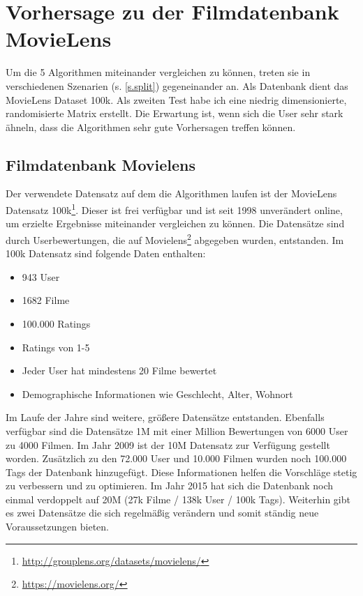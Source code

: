 \section{Vorhersage zu der Filmdatenbank MovieLens}\label{s.Test} \raggedbottom
Um die 5 Algorithmen miteinander vergleichen zu können, treten sie in verschiedenen Szenarien (s.  \autoref{s.split}) gegeneinander an. Als Datenbank dient das MovieLens Dataset 100k. Als zweiten Test habe ich eine niedrig dimensionierte, randomisierte Matrix erstellt. Die Erwartung ist, wenn sich die User sehr stark ähneln, dass die Algorithmen sehr gute Vorhersagen treffen können.

\subsection{Filmdatenbank Movielens}\label{s.Datenmenge}
Der verwendete Datensatz auf dem die Algorithmen laufen ist der MovieLens Datensatz 100k\footnote{\url{http://grouplens.org/datasets/movielens/}}. Dieser ist frei verfügbar und ist seit 1998 unverändert online, um erzielte Ergebnisse miteinander vergleichen zu können. Die Datensätze sind durch Userbewertungen, die auf Movielens\footnote{\url{https://movielens.org/}} abgegeben wurden, entstanden.
Im 100k Datensatz sind folgende Daten enthalten:
\begin{itemize}
	\item 943 User
	\item 1682 Filme
	\item 100.000 Ratings
	\item Ratings von 1-5
	\item Jeder User hat mindestens 20 Filme bewertet
	\item Demographische Informationen wie Geschlecht, Alter, Wohnort
\end{itemize}
Im Laufe der Jahre sind weitere, größere Datensätze entstanden. 
Ebenfalls verfügbar sind die Datensätze 1M mit einer Million Bewertungen von 6000 User zu 4000 Filmen. Im Jahr 2009 ist der 10M Datensatz zur Verfügung gestellt worden. Zusätzlich zu den 72.000 User und 10.000 Filmen wurden noch 100.000 Tags der Datenbank hinzugefügt. Diese Informationen helfen die Vorschläge stetig zu verbessern und zu optimieren. Im Jahr 2015 hat sich die Datenbank noch einmal verdoppelt auf 20M (27k Filme / 138k User / 100k Tags). Weiterhin gibt es zwei Datensätze die sich regelmäßig verändern und somit ständig neue Voraussetzungen bieten.


